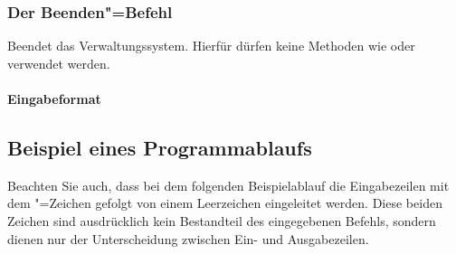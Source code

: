 \documentclass{sdqassignment}
\begin{document}
\subsubsection{Der Beenden"=Befehl}
Beendet das Verwaltungssystem. Hierfür dürfen keine Methoden wie  oder  verwendet werden.
\paragraph{Eingabeformat}


\subsection{Beispiel eines Programmablaufs}
Beachten Sie auch, dass bei dem folgenden Beispielablauf die Eingabezeilen mit dem \lstinlinetxt{>}"=Zeichen gefolgt von einem Leerzeichen eingeleitet werden. Diese beiden Zeichen sind ausdrücklich kein Bestandteil des eingegebenen Befehls, sondern dienen nur der Unterscheidung zwischen Ein- und Ausgabezeilen.

\end{document}

